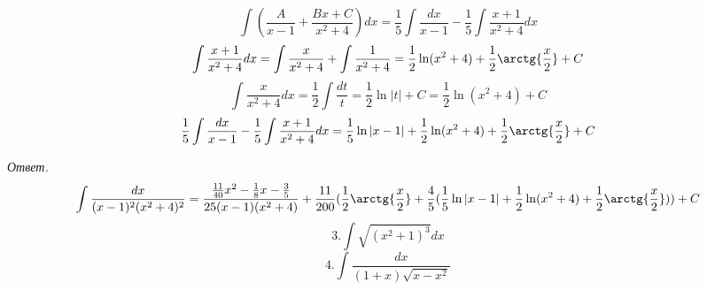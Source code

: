 \documentclass{article}
\begin{document}
	$$\int(\frac{A}{x - 1} + \frac{Bx + C}{x^2 + 4})dx = \frac{1}{5}\int\frac{dx}{x - 1} - \frac{1}{5}\int\frac{x + 1}{x^2 + 4}dx$$
	$$\int\frac{x + 1}{x^2 + 4}dx = \int\frac{x}{x^2+4} + \int\frac{1}{x^2 + 4} = \frac{1}{2}\ln(x^2 + 4) + \frac{1}{2}\arctg{\frac{x}{2}} + C$$
	$$\int\frac{x}{x^2 + 4}dx = \frac{1}{2}\int\frac{dt}{t} = \frac{1}{2}\ln|t| + C = \frac{1}{2}\ln(x^2 + 4) + C$$
	$$\frac{1}{5}\int\frac{dx}{x - 1} - \frac{1}{5}\int\frac{x + 1}{x^2 + 4}dx = \frac{1}{5}\ln|x - 1| + \frac{1}{2}\ln(x^2 + 4) + \frac{1}{2}\arctg{\frac{x}{2}} + C$$

	\emph{Ответ.} $$\int\frac{dx}{(x-1)^2(x^2+4)^2} = \frac{\frac{11}{40}x^2 - \frac{1}{8}x - \frac{3}{5}}{25(x-1)(x^2+4)} + \frac{11}{200}(\frac{1}{2}\arctg{\frac{x}{2}} + \frac{4}{5}(\frac{1}{5}\ln|x - 1| + \frac{1}{2}\ln(x^2 + 4) + \frac{1}{2}\arctg{\frac{x}{2}})) + C$$
	\begin{displaymath}
	3. \int \sqrt{(x^2+1)^3} dx
	\end{displaymath}
	\begin{displaymath}
	4. \int \frac{dx}{(1+x)\sqrt{x-x^2}}
	\end{displaymath}
\end{document}
